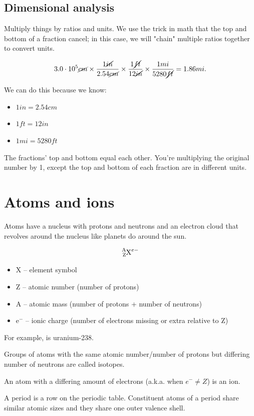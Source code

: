 \documentclass[letterpaper, 12pt]{article}
\begin{document}
	\subsection{Dimensional analysis}
	Multiply things by ratios and units. We use the trick in math that the top and bottom of a fraction cancel; in this case, we will "chain" multiple ratios together to convert units.

	$$3.0 \cdot 10^5 \cancel{cm} \times \frac{1 \cancel{in}}{2.54 \cancel{cm}} \times \frac{1 \cancel{ft}}{12 \cancel{in}} \times \frac{1 mi}{5280 \cancel{ft}} = 1.86 mi.$$
	
	We can do this because we know:
	\begin{itemize}
		\item $1 in = 2.54 cm$
		\item $1 ft = 12 in$
		\item $1 mi = 5280 ft$
	\end{itemize}
	The fractions' top and bottom equal each other. You're multiplying the original number by 1, except the top and bottom of each fraction are in different units.
	
\section{Atoms and ions}
Atoms have a nucleus with protons and neutrons and an electron cloud that revolves around the nucleus like planets do around the sun.

$$\ce{^{A}_{Z}X^{e-}}$$

\begin{itemize}
	\item X -- element symbol
	\item Z -- atomic number (number of protons)
	\item A -- atomic mass (number of protons + number of neutrons)
	\item e$^{-}$ -- ionic charge (number of electrons missing or extra relative to Z)
\end{itemize}

For example,  is uranium-238.

Groups of atoms with the same atomic number/number of protons but differing number of neutrons are called isotopes.

An atom with a differing amount of electrons (a.k.a. when $e^{-} \neq Z$) is an ion.

A period is a row on the periodic table. Constituent atoms of a period share similar atomic sizes and they share one outer valence shell.
\end{document}
